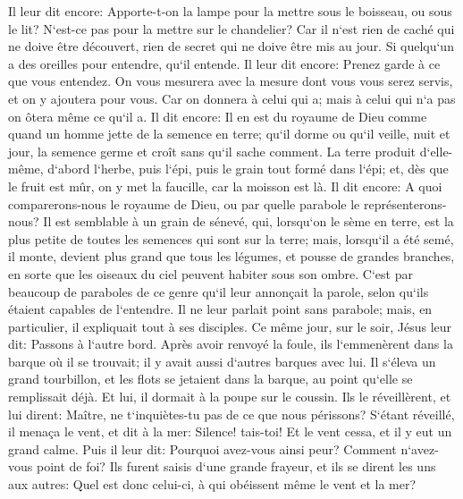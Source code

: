 \verse Il leur dit encore: Apporte-t-on la lampe pour la mettre sous le boisseau, ou sous le lit? N`est-ce pas pour la mettre sur le chandelier? 
\verse Car il n`est rien de caché qui ne doive être découvert, rien de secret qui ne doive être mis au jour. 
\verse Si quelqu`un a des oreilles pour entendre, qu`il entende. 
\verse Il leur dit encore: Prenez garde à ce que vous entendez. On vous mesurera avec la mesure dont vous vous serez servis, et on y ajoutera pour vous. 
\verse Car on donnera à celui qui a; mais à celui qui n`a pas on ôtera même ce qu`il a. 
\verse Il dit encore: Il en est du royaume de Dieu comme quand un homme jette de la semence en terre; 
\verse qu`il dorme ou qu`il veille, nuit et jour, la semence germe et croît sans qu`il sache comment. 
\verse La terre produit d`elle-même, d`abord l`herbe, puis l`épi, puis le grain tout formé dans l`épi; 
\verse et, dès que le fruit est mûr, on y met la faucille, car la moisson est là. 
\verse Il dit encore: A quoi comparerons-nous le royaume de Dieu, ou par quelle parabole le représenterons-nous? 
\verse Il est semblable à un grain de sénevé, qui, lorsqu`on le sème en terre, est la plus petite de toutes les semences qui sont sur la terre; 
\verse mais, lorsqu`il a été semé, il monte, devient plus grand que tous les légumes, et pousse de grandes branches, en sorte que les oiseaux du ciel peuvent habiter sous son ombre. 
\verse C`est par beaucoup de paraboles de ce genre qu`il leur annonçait la parole, selon qu`ils étaient capables de l`entendre. 
\verse Il ne leur parlait point sans parabole; mais, en particulier, il expliquait tout à ses disciples. 
\verse Ce même jour, sur le soir, Jésus leur dit: Passons à l`autre bord. 
\verse Après avoir renvoyé la foule, ils l`emmenèrent dans la barque où il se trouvait; il y avait aussi d`autres barques avec lui. 
\verse Il s`éleva un grand tourbillon, et les flots se jetaient dans la barque, au point qu`elle se remplissait déjà. 
\verse Et lui, il dormait à la poupe sur le coussin. Ils le réveillèrent, et lui dirent: Maître, ne t`inquiètes-tu pas de ce que nous périssons? 
\verse S`étant réveillé, il menaça le vent, et dit à la mer: Silence! tais-toi! Et le vent cessa, et il y eut un grand calme. 
\verse Puis il leur dit: Pourquoi avez-vous ainsi peur? Comment n`avez-vous point de foi? 
\verse Ils furent saisis d`une grande frayeur, et ils se dirent les uns aux autres: Quel est donc celui-ci, à qui obéissent même le vent et la mer? 

\chapter{}

